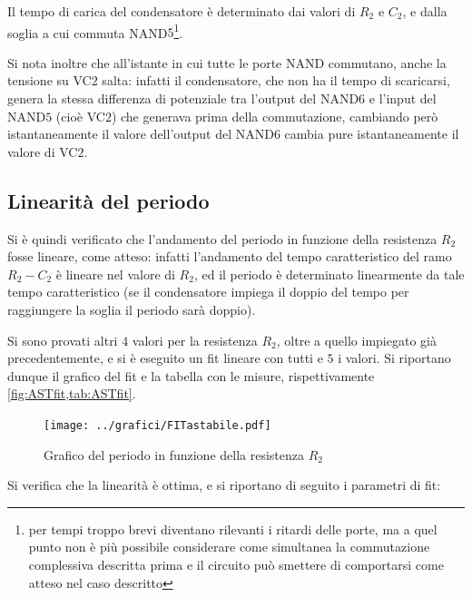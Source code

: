 \documentclass[a4paper,10pt]{article}
\begin{document}
Il tempo di carica del condensatore è determinato dai valori di $R_2$ e $C_2$, e dalla soglia a cui commuta NAND$5$\footnote{per tempi troppo brevi diventano rilevanti i ritardi delle porte, ma a quel punto non è più possibile considerare come simultanea la commutazione complessiva descritta prima e il circuito può smettere di comportarsi come atteso nel caso descritto}.

Si nota inoltre che all'istante in cui tutte le porte NAND commutano, anche la tensione su VC$2$ salta: infatti il condensatore, che non ha il tempo di scaricarsi, genera la stessa differenza di potenziale tra l'output del NAND$6$ e l'input del NAND$5$ (cioè VC$2$) che generava prima della commutazione, cambiando però istantaneamente il valore dell'output del NAND$6$ cambia pure istantaneamente il valore di VC$2$.

\subsection{Linearità del periodo}
Si è quindi verificato che l'andamento del periodo in funzione della resistenza $R_2$ fosse lineare, come atteso: infatti l'andamento del tempo caratteristico del ramo $R_2-C_2$ è lineare nel valore di $R_2$, ed il periodo è determinato linearmente da tale tempo caratteristico (se il condensatore impiega il doppio del tempo per raggiungere la soglia il periodo sarà doppio).

Si sono provati altri $4$ valori per la resistenza $R_2$, oltre a quello impiegato già precedentemente, e si è eseguito un fit lineare con tutti e $5$ i valori. Si riportano dunque il grafico del fit e la tabella con le misure, rispettivamente \cref{fig:ASTfit,tab:ASTfit}.

\begin{figure}[H]
	\centering
	\begin{minipage}{0.49\textwidth}
		\centering
		\texttt{[image: ../grafici/FITastabile.pdf]}
		\caption{Grafico del periodo in funzione della resistenza $R_2$}
		\label{fig:ASTfit}
	\end{minipage}
	\begin{minipage}{0.49\textwidth}
		\centering
		\resizebox{0.7\textwidth}{!}{
			}
		\label{tab:ASTfit}
	\end{minipage}
\end{figure}

Si verifica che la linearità è ottima, e si riportano di seguito i parametri di fit:
\end{document}
